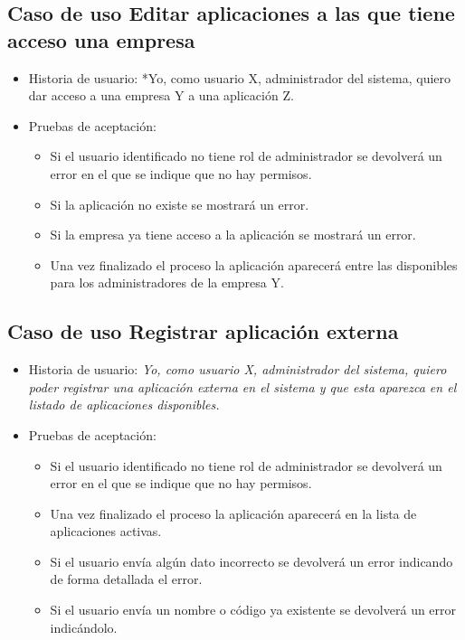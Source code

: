 \documentclass[12pt,a4paperpaper,]{report}
\providecommand{\tightlist}{%
  \setlength{\itemsep}{0pt}\setlength{\parskip}{0pt}}
\begin{document}
\subsection{Caso de uso Editar aplicaciones a las que tiene acceso una
empresa}\label{caso-de-uso-editar-aplicaciones-a-las-que-tiene-acceso-una-empresa}

\begin{itemize}
\tightlist
\item
  Historia de usuario: *Yo, como usuario X, administrador del sistema,
  quiero dar acceso a una empresa Y a una aplicación Z.
\item
  Pruebas de aceptación:

  \begin{itemize}
  \tightlist
  \item
    Si el usuario identificado no tiene rol de administrador se
    devolverá un error en el que se indique que no hay permisos.
  \item
    Si la aplicación no existe se mostrará un error.
  \item
    Si la empresa ya tiene acceso a la aplicación se mostrará un error.
  \item
    Una vez finalizado el proceso la aplicación aparecerá entre las
    disponibles para los administradores de la empresa Y.
  \end{itemize}
\end{itemize}

\subsection{Caso de uso Registrar aplicación
externa}\label{caso-de-uso-registrar-aplicaciuxf3n-externa-1}

\begin{itemize}
\tightlist
\item
  Historia de usuario: \emph{Yo, como usuario X, administrador del
  sistema, quiero poder registrar una aplicación externa en el sistema y
  que esta aparezca en el listado de aplicaciones disponibles.}
\item
  Pruebas de aceptación:

  \begin{itemize}
  \tightlist
  \item
    Si el usuario identificado no tiene rol de administrador se
    devolverá un error en el que se indique que no hay permisos.
  \item
    Una vez finalizado el proceso la aplicación aparecerá en la lista de
    aplicaciones activas.
  \item
    Si el usuario envía algún dato incorrecto se devolverá un error
    indicando de forma detallada el error.
  \item
    Si el usuario envía un nombre o código ya existente se devolverá un
    error indicándolo.
  \end{itemize}
\end{itemize}
\end{document}
